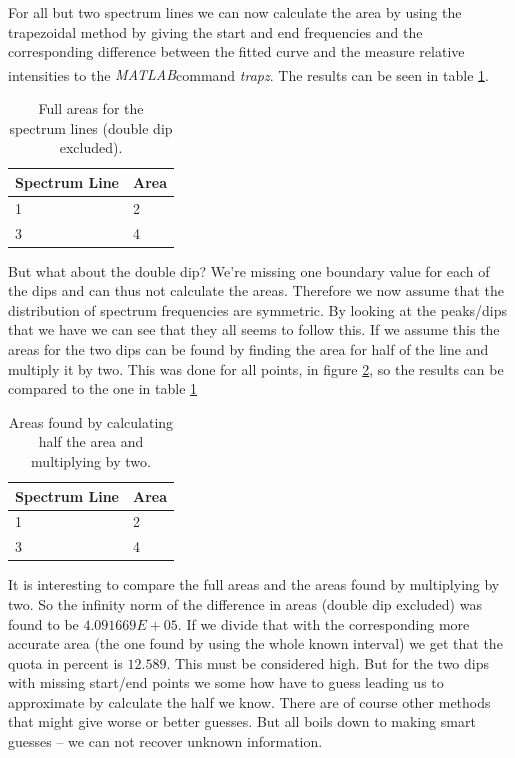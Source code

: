 \documentclass[10pt, a4paper]{article}
\newcommand{\matlab}{\small{\emph{MATLAB\textsuperscript{\textregistered}}}}
\begin{document}
For all but two spectrum lines we can now calculate the area by using the trapezoidal method by giving the start and end frequencies and the corresponding difference between the fitted curve and the measure relative intensities to the \matlab command \emph{trapz}. The results can be seen in table \ref{table:areas}.

\begin{table}[h]
\begin{center}
\begin{tabular}{l | l} %
Spectrum Line & Area \\ \hline
1		 & 2	   \\
3		 & 4
\end{tabular}
\end{center}
\caption{Full areas for the spectrum lines (double dip excluded).}
\label{table:areas}
\end{table}

But what about the double dip? We're missing one boundary value for each of the dips and can thus not calculate the areas. Therefore we now assume that the distribution of spectrum frequencies are symmetric. By looking at the peaks/dips that we have we can see that they all seems to follow this. If we assume this the areas for the two dips can be found by finding the area for half of the line and multiply it by two. This was done for all points, in figure \ref{table:halfareas}, so the results can be compared to the one in table \ref{table:areas} %

\begin{table}[h]
\begin{center}
\begin{tabular}{l | l} %
Spectrum Line & Area \\ \hline
1		 & 2	   \\
3		 & 4
\end{tabular}
\end{center}
\caption{Areas found by calculating half the area and multiplying by two.}
\label{table:halfareas}
\end{table}

It is interesting to compare the full areas and the areas found by multiplying by two. So the infinity norm of the difference in areas (double dip excluded) was found to be $ 4.091669E+05$. If we divide that with the corresponding more accurate area (the one found by using the whole known interval) we get that the quota in percent is $12.589$. This must be considered high. But for the two dips with missing start/end points we some how have to guess leading us to approximate by calculate the half we know. There are of course other methods that might give worse or better guesses. But all boils down to making smart guesses -- we can not recover unknown information. %
\end{document}
